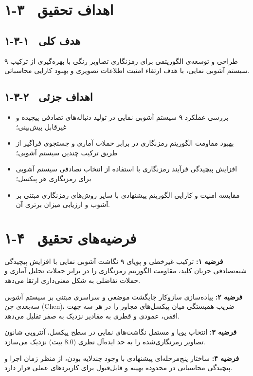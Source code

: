 \section{۱-۳  اهداف تحقيق}

\subsection{۱-۳-۱  هدف کلی}

طراحی و توسعه‌ی الگوریتمی برای رمزنگاری تصاویر رنگی با بهره‌گیری از ترکیب ۹ سیستم آشوبی نمایی، با هدف ارتقاء امنیت اطلاعات تصویری و بهبود کارایی محاسباتی.

\subsection{۱-۳-۲  اهداف جزئی}

\begin{itemize}
    \item بررسی عملکرد ۹ سیستم آشوبی نمایی در تولید دنباله‌های تصادفی پیچیده و غیرقابل پیش‌بینی؛
    \item بهبود مقاومت الگوریتم رمزنگاری در برابر حملات آماری و جستجوی فراگیر از طریق ترکیب چندین سیستم آشوبی؛
    \item افزایش پیچیدگی فرآیند رمزنگاری با استفاده از انتخاب تصادفی سیستم آشوبی برای رمزنگاری هر پیکسل؛
    \item مقایسه امنیت و کارایی الگوریتم پیشنهادی با سایر روش‌های رمزنگاری مبتنی بر آشوب و ارزیابی میزان برتری آن.
\end{itemize}

\section{۱-۴  فرضیه‌های تحقیق}

\textbf{فرضیه ۱:} ترکیب غیرخطی و پویای ۹ نگاشت آشوبی نمایی با افزایش پیچیدگی شبه‌تصادفی جریان کلید، مقاومت الگوریتم رمزنگاری را در برابر حملات تحلیل آماری و حملات تفاضلی به شکل معنی‌داری ارتقا می‌دهد.

\textbf{فرضیه ۲:} پیاده‌سازی سازوکار جایگشت موضعی و سراسری مبتنی بر سیستم آشوبی سه‌بعدی چن (‎Chen‎)، ضریب همبستگی میان پیکسل‌های مجاور را در هر سه جهت افقی، عمودی و قطری به مقادیر نزدیک به صفر تقلیل می‌دهد.

\textbf{فرضیه ۳:} انتخاب پویا و مستقل نگاشت‌های نمایی در سطح پیکسل، آنتروپی شانون تصاویر رمزنگاری‌شده را به حد ایده‌آل نظری ($8.0$ بیت) نزدیک می‌سازد.

\textbf{فرضیه ۴:} ساختار پنج‌مرحله‌ای پیشنهادی با وجود چندلایه بودن، از منظر زمان اجرا و پیچیدگی محاسباتی در محدوده بهینه و قابل‌قبول برای کاربردهای عملی قرار دارد.

